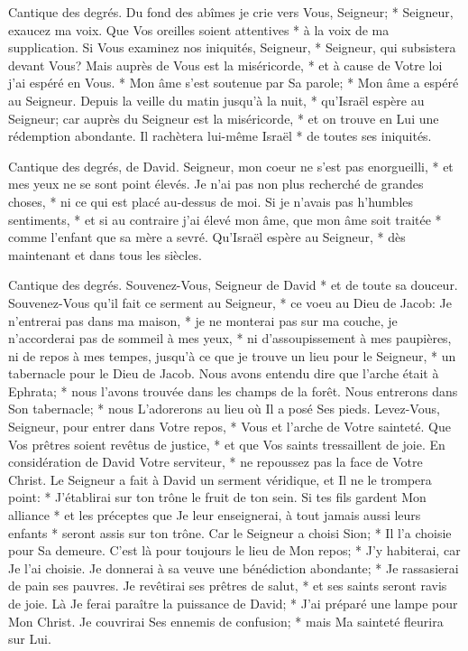 Cantique des degrés. Du fond des abîmes je crie vers Vous, Seigneur; *
Seigneur, exaucez ma voix. Que Vos oreilles soient attentives * à la voix de ma supplication.
Si Vous examinez nos iniquités, Seigneur, * Seigneur, qui subsistera devant Vous?
Mais auprès de Vous est la miséricorde, * et à cause de Votre loi j'ai espéré en Vous. * Mon âme s'est soutenue par Sa parole; *
Mon âme a espéré au Seigneur.
Depuis la veille du matin jusqu'à la nuit, * qu'Israël espère au Seigneur;
car auprès du Seigneur est la miséricorde, * et on trouve en Lui une rédemption abondante.
Il rachètera lui-même Israël * de toutes ses iniquités.

Cantique des degrés, de David. Seigneur, mon coeur ne s'est pas enorgueilli, * et mes yeux ne se sont point élevés. Je n'ai pas non plus recherché de grandes choses, * ni ce qui est placé au-dessus de moi.
Si je n'avais pas h'humbles sentiments, * et si au contraire j'ai élevé mon âme, que mon âme soit traitée * comme l'enfant que sa mère a sevré.
Qu'Israël espère au Seigneur, * dès maintenant et dans tous les siècles.

Cantique des degrés. Souvenez-Vous, Seigneur de David * et de toute sa douceur.
Souvenez-Vous qu'il fait ce serment au Seigneur, * ce voeu au Dieu de Jacob:
Je n'entrerai pas dans ma maison, * je ne monterai pas sur ma couche,
je n'accorderai pas de sommeil à mes yeux, * ni d'assoupissement à mes paupières,
ni de repos à mes tempes, jusqu'à ce que je trouve un lieu pour le Seigneur, * un tabernacle pour le Dieu de Jacob.
Nous avons entendu dire que l'arche était à Ephrata; * nous l'avons trouvée dans les champs de la forêt.
Nous entrerons dans Son tabernacle; * nous L'adorerons au lieu où Il a posé Ses pieds.
Levez-Vous, Seigneur, pour entrer dans Votre repos, * Vous et l'arche de Votre sainteté.
Que Vos prêtres soient revêtus de justice, * et que Vos saints tressaillent de joie.
En considération de David Votre serviteur, * ne repoussez pas la face de Votre Christ.
Le Seigneur a fait à David un serment véridique, et Il ne le trompera point: * J'établirai sur ton trône le fruit de ton sein.
Si tes fils gardent Mon alliance * et les préceptes que Je leur enseignerai, à tout jamais aussi leurs enfants * seront assis sur ton trône.
Car le Seigneur a choisi Sion; * Il l'a choisie pour Sa demeure.
C'est là pour toujours le lieu de Mon repos; * J'y habiterai, car Je l'ai choisie.
Je donnerai à sa veuve une bénédiction abondante; * Je rassasierai de pain ses pauvres.
Je revêtirai ses prêtres de salut, * et ses saints seront ravis de joie.
Là Je ferai paraître la puissance de David; * J'ai préparé une lampe pour Mon Christ.
Je couvrirai Ses ennemis de confusion; * mais Ma sainteté fleurira sur Lui.

